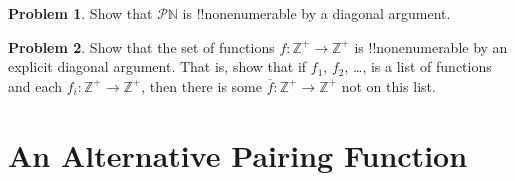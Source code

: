 \documentclass[10pt,a4paper]{article}
\theoremstyle{plain}
\theoremstyle{definition}
\newtheorem{prob}{Problem}[section]
\theoremstyle{remark}
\newcommand*{\olfileid}[3]{}
\newcommand*{\olsection}[1]{\section*{#1}}
\providecommand{\Nat}{\ensuremath{\mathbb{N}}}
\providecommand{\PosInt}{\mathbb{Z}^{+}}
\providecommand{\Pow}{\mathcal{P}}
\begin{document}
\begin{prob}
Show that $\Pow{\Nat}$ is !!{nonenumerable} by a diagonal argument.
\end{prob}

\begin{prob}\label{sfr:siz:nen:prob:f-posint}
Show that the set of functions $f \colon \PosInt \to \PosInt$ is
!!{nonenumerable} by an explicit diagonal argument. That is, show that
if $f_1$, $f_2$, \dots, is a list of functions and each $f_i\colon
\PosInt \to \PosInt$, then there is some $\overline{f}\colon \PosInt \to
\PosInt$ not on this list.
\end{prob}





\olfileid{sfr}{siz}{pai-alt}

\olsection{An Alternative Pairing Function}
\end{document}
